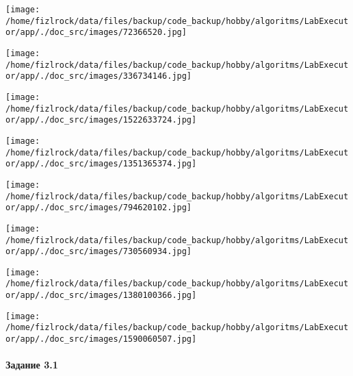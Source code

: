 \documentclass[a4paper, 12pt]{article}
\begin{document}
\texttt{[image: /home/fizlrock/data/files/backup/code\_backup/hobby/algoritms/LabExecutor/app/./doc\_src/images/72366520.jpg]}

\texttt{[image: /home/fizlrock/data/files/backup/code\_backup/hobby/algoritms/LabExecutor/app/./doc\_src/images/336734146.jpg]}

\texttt{[image: /home/fizlrock/data/files/backup/code\_backup/hobby/algoritms/LabExecutor/app/./doc\_src/images/1522633724.jpg]}

\texttt{[image: /home/fizlrock/data/files/backup/code\_backup/hobby/algoritms/LabExecutor/app/./doc\_src/images/1351365374.jpg]}

\texttt{[image: /home/fizlrock/data/files/backup/code\_backup/hobby/algoritms/LabExecutor/app/./doc\_src/images/794620102.jpg]}

\texttt{[image: /home/fizlrock/data/files/backup/code\_backup/hobby/algoritms/LabExecutor/app/./doc\_src/images/730560934.jpg]}

\texttt{[image: /home/fizlrock/data/files/backup/code\_backup/hobby/algoritms/LabExecutor/app/./doc\_src/images/1380100366.jpg]}

\texttt{[image: /home/fizlrock/data/files/backup/code\_backup/hobby/algoritms/LabExecutor/app/./doc\_src/images/1590060507.jpg]}
\pagebreak
\paragraph{Задание 3.1}
\end{document}
